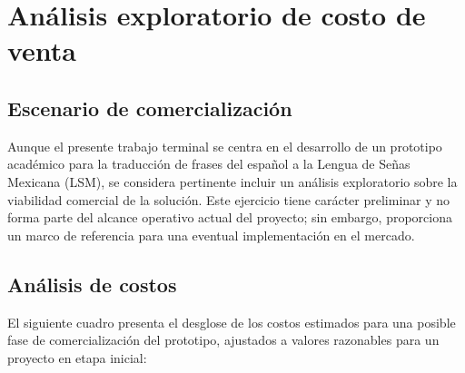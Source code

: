 \newpage
\section{Análisis exploratorio de costo de venta}

\subsection{Escenario de comercialización}

Aunque el presente trabajo terminal se centra en el desarrollo de un prototipo académico para la traducción de frases del español a la Lengua de Señas Mexicana (LSM), se considera pertinente incluir un análisis exploratorio sobre la viabilidad comercial de la solución. Este ejercicio tiene carácter preliminar y no forma parte del alcance operativo actual del proyecto; sin embargo, proporciona un marco de referencia para una eventual implementación en el mercado.

\subsection{Análisis de costos}

El siguiente cuadro presenta el desglose de los costos estimados para una posible fase de comercialización del prototipo, ajustados a valores razonables para un proyecto en etapa inicial:

\begin{table}[H]
	\centering
	\renewcommand{\arraystretch}{1.5}
	\setlength{\tabcolsep}{12pt}
	\caption{Proyección de costos para una posible fase comercial}
	\label{tab:costos_venta}
\end{table}

